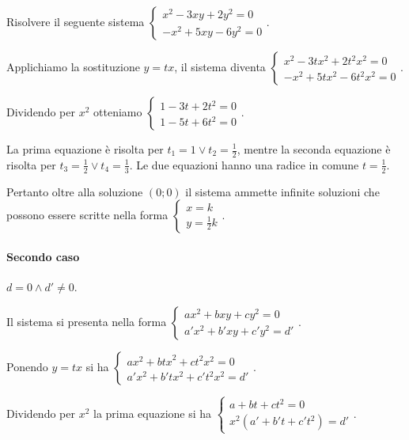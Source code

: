 \begin{esempio}{}{}
Risolvere il seguente sistema \(\left\{\begin{array}{l}x^2-3{xy}+2y^2=0 
\\-x^2+5{xy}-6y^2=0 \end{array}\right.\).

Applichiamo la sostituzione \(y={tx}\), il sistema diventa 
\(\left\{\begin{array}{l}x^2-3{tx}^2+2t^2x^2=0 \\-x^2+5{tx}^2-6t^2x^2=0 
\end{array}\right.\).

Dividendo per \(x^2\) otteniamo \(\left\{\begin{array}{l}1-3t+2t^2=0 
\\1-5t+6t^2=0 \end{array}\right.\).

La prima equazione è risolta per \(t_1=1\vee t_2=\frac 1 2\), mentre la seconda 
equazione è risolta per \(t_3=\frac 1 2\vee t_4=\frac 1 3\). Le due equazioni 
hanno una radice in comune \(t=\frac 1 2\).

Pertanto oltre alla soluzione \((0;0)\) il sistema ammette infinite soluzioni 
che possono essere scritte nella forma \(\left\{\begin{array}{l}x=k \\y=\frac 1 
2k \end{array}\right.\).
\end{esempio}


\paragraph{Secondo caso}\(d=0 \wedge d'\neq 0\).

Il sistema si presenta nella forma 
\(\left\{\begin{array}{l}{{ax}^2+{bxy}+{cy}^2=0}\\{a'x^2+b'{xy}+c'y^2=d'}
         \end{array}\right.\).

Ponendo \(y={tx}\) si ha 
\(\left\{\begin{array}{l}{{ax}^2+{btx}^2+{ct}^2x^2=0}\\{a'x^2+b'{tx}^2+c't^2x^2=
d'}\end{array}\right.\).

Dividendo per \(x^2\) la prima equazione si ha 
\(\left\{\begin{array}{l}{a+{bt}+{ct}^2=0}\\{x^2(a'+b't+c't^2)=d'}
\end{array}\right.\).

